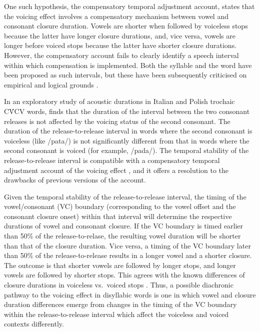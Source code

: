 \documentclass[
  12pt,
  a4paper,
]{article}
\begin{document}
One such hypothesis, the compensatory temporal adjustment account,
states that the voicing effect involves a compensatory mechanism between
vowel and consonant closure duration. Vowels are shorter when followed
by voiceless stops because the latter have longer closure durations,
and, vice versa, vowels are longer before voiced stops because the
latter have shorter closure durations. However, the compensatory account
fails to clearly identify a speech interval within which compensation is
implemented. Both the syllable \citep{lindblom1967, farnetani1986} and
the word \citep{slis1969, slis1969a, lehiste1970a, lehiste1970} have
been proposed as such intervals, but these have been subsequently
criticised on empirical and logical grounds
\citep{chen1970, jacewicz2009, maddieson1976, coretta2018j}.

In an exploratory study of acoustic durations in Italian and Polish
trochaic CV́CV words, \citet{coretta2018j} finds that the duration of the
interval between the two consonant releases is not affected by the
voicing status of the second consonant. The duration of the
release-to-release interval in words where the second consonant is
voiceless (like /pata/) is not significantly different from that in
words where the second consonant is voiced (for example, /pada/). The
temporal stability of the release-to-release interval is compatible with
a compensatory temporal adjustment account of the voicing effect
\citep{lindblom1967, slis1969, slis1969a, lehiste1970a, lehiste1970},
and it offers a resolution to the drawbacks of previous versions of the
account.

Given the temporal stability of the release-to-release interval, the
timing of the vowel/consonant (VC) boundary (corresponding to the vowel
offset and the consonant closure onset) within that interval will
determine the respective durations of vowel and consonant closure. If
the VC boundary is timed earlier than 50\% of the release-to-relase, the
resulting vowel duration will be shorter than that of the closure
duration. Vice versa, a timing of the VC boundary later than 50\% of the
release-to-release results in a longer vowel and a shorter closure. The
outcome is that shorter vowels are followed by longer stops, and longer
vowels are followed by shorter stops. This agrees with the known
differences of closure durations in voiceless vs.~voiced stops
\citep{lisker1957, van-summers1987, davis1989, de-jong1991}. Thus, a
possible diachronic pathway to the voicing effect in disyllabic words is
one in which vowel and closure duration differences emerge from changes
in the timing of the VC boundary within the release-to-release interval
which affect the voiceless and voiced contexts differently.
\end{document}
